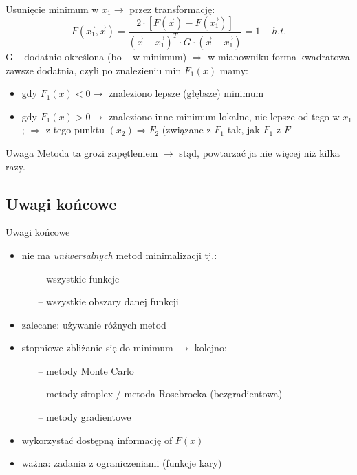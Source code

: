   \begin{frame}
    Usunięcie minimum w $x_{1} \to$ przez transformację:
    \begin{displaymath}
      F(\vec{x_{1}}{,}\vec{x}) =
      \frac{2 \cdot \left[ F(\vec{x}) - F(\vec{x_{1}}) \right]}
      {(\vec{x} - \vec{x_{1}})^T \cdot G \cdot (\vec{x} - \vec{x_{1}})} =
      1 + h.t.
    \end{displaymath}
    G -- dodatnio określona (bo -- w minimum) $\Rightarrow$
    w mianowniku forma kwadratowa zawsze dodatnia, czyli
    po znalezieniu min $F_{1}(x)$ mamy:
    \begin{itemize}
      \item gdy $F_{1}(x) < 0 \to$ znaleziono lepsze
      (głębsze) minimum
      \item gdy $F_{1}(x) > 0 \to$ znaleziono inne minimum
      lokalne, nie lepsze od tego w $x_{1}$; $\Rightarrow$
      z tego punktu $(x_{2}) \Rightarrow F_{2}$ (związane z
      $F_{1}$ tak, jak $F_{1}$ z $F$
    \end{itemize}
    \begin{alertblock}{Uwaga}
      Metoda ta grozi zapętleniem $\to$ stąd, powtarzać
      ja nie więcej niż kilka razy.
    \end{alertblock}
  \end{frame}

  \subsection{Uwagi końcowe}
  \begin{frame}{Uwagi końcowe}
    \begin{itemize}
      \item nie ma \emph{uniwersalnych} metod
      minimalizacji tj.:
      \begin{itemize}
        \item[--] wszystkie funkcje
        \item[--] wszystkie obszary danej funkcji
      \end{itemize}
      \item zalecane: używanie różnych metod
      \item stopniowe zbliżanie się do minimum $\to$
      kolejno:
      \begin{itemize}
        \item[--] metody Monte Carlo
        \item[--] metody simplex / metoda Rosebrocka
        (bezgradientowa)
        \item[--] metody gradientowe
      \end{itemize}
      \item wykorzystać dostępną informację of $F(x)$
      \item ważna: zadania z ograniczeniami (funkcje kary)
    \end{itemize}
  \end{frame}

